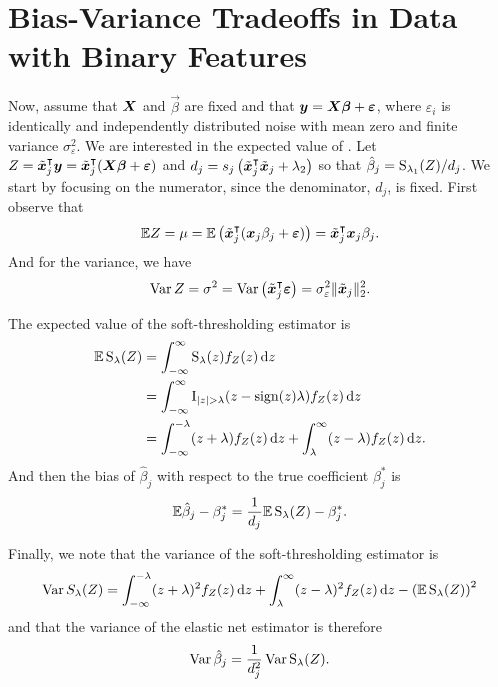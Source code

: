 \section{Bias-Variance Tradeoffs in Data with Binary Features}

Now, assume that \(\boldsymbol{X}\) and \(\vec{\beta}\) are fixed and that \(\boldsymbol{y} = \boldsymbol{X}\boldsymbol{\beta} + \boldsymbol{\varepsilon}\), where \(\varepsilon_i\) is identically and independently distributed noise with mean zero and finite variance \(\sigma_\varepsilon^2\). We are interested in the expected value of . Let \(Z = \tilde{\boldsymbol{x}}_j^\intercal \boldsymbol{y} = \tilde{\boldsymbol{x}}_j^\intercal(\boldsymbol{X}\boldsymbol{\beta} + \boldsymbol{\varepsilon})\) and \(d_j = s_j\left(\tilde{\boldsymbol{x}}_j^\intercal \tilde{\boldsymbol{x}}_j + \lambda_2\right)\) so that \(\hat{\beta}_j = \operatorname{S}_{\lambda_1}(Z)/d_j\). We start by focusing on the numerator, since the denominator, \(d_j\), is fixed. First observe that
\[
  \mathbb{E} Z = \mu = \mathbb{E} \left( \tilde{\boldsymbol{x}}_j^\intercal (\boldsymbol{x}_j\beta_j + \boldsymbol{\varepsilon}) \right)  = \tilde{\boldsymbol{x}}_j^\intercal\boldsymbol{x}_j \beta_j.
\]
And for the variance, we have
\[
  \operatorname{Var} Z = \sigma^2 = \operatorname{Var}\left(\tilde{\boldsymbol{x}}_j ^\intercal \boldsymbol{\varepsilon}\right) = \sigma_\varepsilon^2 \lVert \tilde{\boldsymbol{x}}_j\rVert_2^2 .
\]

The expected value of the soft-thresholding estimator is
\begin{align}
  \label{eq:st-expected-value}
  \mathbb{E} \operatorname{S}_\lambda(Z) & = \int_{-\infty}^\infty \operatorname{S}_\lambda(z) f_Z(z) \mathop{}\!\mathrm{d} z                                                   \nonumber \\
                    & = \int_{-\infty}^\infty \operatorname{I}_{|z| > \lambda} (z -\operatorname{sign}(z)\lambda) f_Z(z) \mathop{}\!\mathrm{d} z                         \nonumber \\
                    & = \int_{-\infty}^{-\lambda}(z + \lambda)f_Z(z) \mathop{}\!\mathrm{d} z + \int_{\lambda}^\infty (z - \lambda)f_Z(z) \mathop{}\!\mathrm{d} z.
\end{align}
And then the bias of \(\hat\beta_j\) with respect to the true coefficient \(\beta_j^*\) is
\begin{equation}
  \label{eq:betahat-bias}
  \mathbb{E} \hat\beta_j - \beta_j^* = \frac{1}{d_j}\mathbb{E} \operatorname{S}_\lambda(Z) - \beta^*_j.
\end{equation}

Finally, we note that the variance of the soft-thresholding estimator is
\begin{equation}
  \label{eq:st-variance}
  \operatorname{Var} {S_\lambda(Z)} = \int_{-\infty}^{-\lambda}(z + \lambda)^2f_Z(z) \mathop{}\!\mathrm{d} z + \int_{\lambda}^\infty (z - \lambda)^2 f_Z(z) \mathop{}\!\mathrm{d} z - \left(\mathbb{E} \operatorname{S}_\lambda(Z)\right)^2
\end{equation}
and that the variance of the elastic net estimator is therefore
\begin{equation}
  \label{eq:betahat-variance}
  \operatorname{Var} \hat\beta_j = \frac{1}{d_j^2} \operatorname{Var} \operatorname{S}_\lambda(Z).
\end{equation}

